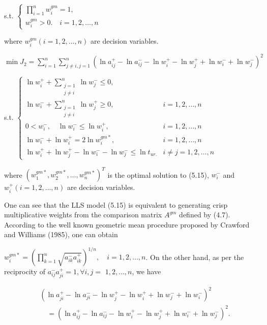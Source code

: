 \documentclass[10pt]{article}
\begin{document}
s.t. $\left\{\begin{array}{l}\prod_{i=1}^{n} w_{i}^{g m}=1, \\ w_{i}^{g m}>0 . \quad i=1,2, \ldots, n\end{array}\right.$

where $w_{i}^{g m}(i=1,2, \ldots, n)$ are decision variables.

$\min J_{2}=\sum_{i=1}^{n} \sum_{j \neq i, j=1}^{n}\left(\ln a_{i j}^{+}-\ln a_{i j}^{-}-\ln w_{i}^{+}-\ln w_{j}^{+}+\ln w_{i}^{-}+\ln w_{j}^{-}\right)^{2}$

s.t. $\begin{cases}\ln w_{i}^{+}+\sum_{\substack{j=1 \\ j \neq i}}^{n} \ln w_{j}^{-} \leq 0, & \\ \ln w_{i}^{-}+\sum_{\substack{j=1 \\ j \neq i}}^{n} \ln w_{j}^{+} \geq 0, & i=1,2, \ldots, n \\ 0<w_{i}^{-}, \quad \ln w_{i}^{-} \leq \ln w_{i}^{+}, & i=1,2, \ldots, n \\ \ln w_{i}^{-}+\ln w_{i}^{+}=2 \ln w_{i}^{g m *}, & i=1,2, \ldots, n \\ \ln w_{i}^{+}+\ln w_{j}^{+}-\ln w_{i}^{-}-\ln w_{j}^{-} \leq \ln t_{u r .} & i \neq j=1,2, \ldots, n\end{cases}$

where $\left(w_{1}^{g m *}, w_{2}^{g m *}, \ldots, w_{n}^{g m *}\right)^{T}$ is the optimal solution to (5.15), $w_{i}^{-}$ and $w_{i}^{+}(i=1,2, \ldots, n)$ are decision variables.

One can see that the LLS model (5.15) is equivalent to generating crisp multiplicative weights from the comparison matrix $A^{g m}$ defined by (4.7). According to the well known geometric mean procedure proposed by Crawford and Williams (1985), one can obtain

$w_{i}^{g m *}=\left(\prod_{k=1}^{n} \sqrt{a_{i k}^{-} a_{i k}^{+}}\right)^{1 / n}, \quad i=1,2, \ldots, n$.
On the other hand, as per the reciprocity of $a_{i j}^{-} a_{j i}^{+}=1, \forall i, j=$ $1,2, \ldots, n$, we have

$$
\begin{aligned}
& \left(\ln a_{j i}^{+}-\ln a_{j i}^{-}-\ln w_{j}^{+}-\ln w_{i}^{+}+\ln w_{j}^{-}+\ln w_{i}^{-}\right)^{2} \\
& \quad=\left(\ln a_{i j}^{+}-\ln a_{i j}^{-}-\ln w_{i}^{+}-\ln w_{j}^{+}+\ln w_{i}^{-}+\ln w_{j}^{-}\right)^{2} .
\end{aligned}
$$
\end{document}
